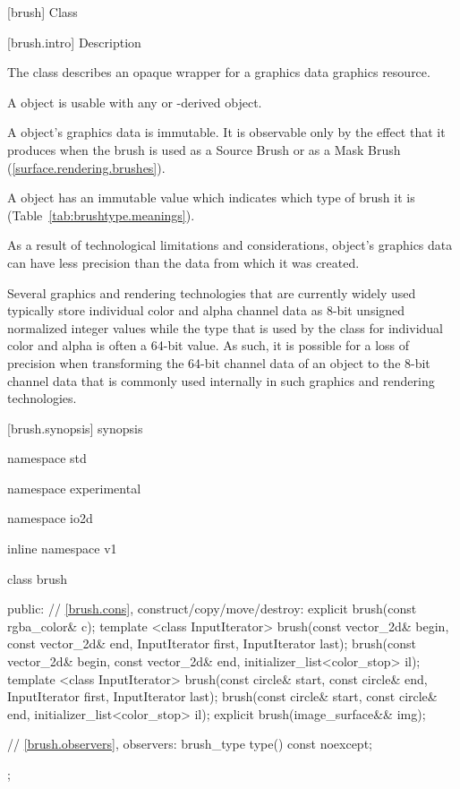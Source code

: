  [brush] {Class }

 [brush.intro] { Description}

\pnum
{}
The class  describes an opaque wrapper for a graphics data graphics resource.

\pnum
A  object is usable with any  or -derived object.

\pnum
A  object's graphics data is immutable. It is observable only by the effect that it produces when the brush is used as a Source Brush or as a Mask Brush (\ref{surface.rendering.brushes}).

\pnum
A  object has an immutable  value which indicates which type of brush it is (Table~\ref{tab:brushtype.meanings}).

\pnum
As a result of technological limitations and considerations,  object's graphics data can have less precision than the data from which it was created.

\pnum
\enterexample
Several graphics and rendering technologies that are currently widely used typically store individual color and alpha channel data as 8-bit unsigned normalized integer values while the  type that is used by the  class for individual color and alpha is often a 64-bit value. As such, it is possible for a loss of precision when transforming the 64-bit channel data of an  object to the 8-bit channel data that is commonly used internally in such graphics and rendering technologies.
\exitexample

 [brush.synopsis] { synopsis}

\begin{codeblock}
namespace std { namespace experimental { namespace io2d { inline namespace v1 {
  class brush {
  public:
    // \ref{brush.cons}, construct/copy/move/destroy:
    explicit brush(const rgba_color& c);
    template <class InputIterator>
    brush(const vector_2d& begin, const vector_2d& end,
      InputIterator first, InputIterator last);
    brush(const vector_2d& begin, const vector_2d& end,
      initializer_list<color_stop> il);
    template <class InputIterator>
    brush(const circle& start, const circle& end,
      InputIterator first, InputIterator last);
    brush(const circle& start, const circle& end,
      initializer_list<color_stop> il);
    explicit brush(image_surface&& img);

    // \ref{brush.observers}, observers:
    brush_type type() const noexcept;
  };
} } } }
\end{codeblock}

